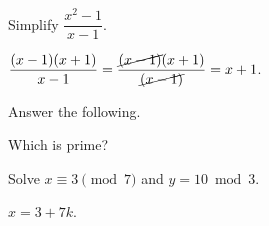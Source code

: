 \documentclass[addpoints,answers]{exam}
\begin{document}
\begin{center}
\end{center}

\vspace{0.5cm}

\begin{questions}
\question[10] Simplify $\dfrac{x^2 - 1}{x - 1}$.
\begin{solution}
$\dfrac{(x-1)(x+1)}{x-1} = \dfrac{\cancel{(x-1)}(x+1)}{\cancel{(x-1)}} = x + 1$.
\end{solution}

\question Answer the following.

\question[4] Which is prime?
\begin{choices}
\end{choices}

\question[6] Solve $x \equiv 3 \pmod{7}$ and $y = 10 \bmod 3$.
\begin{solutionorlines}[1in]
$x = 3 + 7k$.
\end{solutionorlines}
\end{questions}

\gradetable[h][questions]
\end{document}
